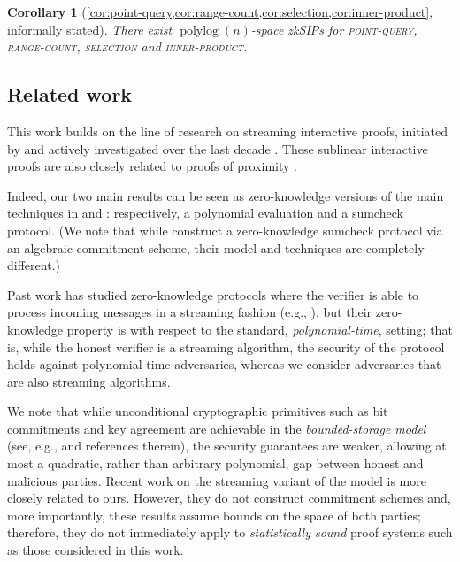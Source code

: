 \documentclass[a4paper,UKenglish,cleveref, autoref, thm-restate]{lipics-v2021}
\newtheorem{corollary}[theorem]{Corollary}
\theoremstyle{definition}
\newcommand{\zksip}{\textrm{zkSIP}}
\newcommand{\polylog}{\operatorname{polylog}}
\newcommand{\pointquery}{\normalfont\textsc{point-query}\xspace}
\newcommand{\rangecount}{\normalfont\textsc{range-count}\xspace}
\newcommand{\selection}{\normalfont\textsc{selection}\xspace}
\newcommand{\innerproductproblem}{\normalfont\textsc{inner-product}\xspace}
\begin{document}
\begin{corollary}[\cref{cor:point-query,cor:range-count,cor:selection,cor:inner-product}, informally stated]
    \label{infcor:inner-product}
    There exist $\polylog(n)$-space \zksip{}s for \pointquery, \rangecount, \selection and \innerproductproblem.
\end{corollary}

\subsection{Related work}

    This work builds on the line of research on streaming interactive proofs, initiated by \cite{CCM09,CCMT14} and actively investigated over the last decade \cite{CMT13, CTY11, CMT12, CCGT14, T14, GR15, CCMTV15, DTV15, ADRV16, CH18, CCMTV19, G20, CGT20}. These sublinear interactive proofs are also closely related to proofs of proximity \cite{RVW13, G17, GR17, GR18, GGR18, RR20,CG18a, GG21, GLR21, DGRT22}.
    
    Indeed, our two main results can be seen as zero-knowledge versions of the main techniques in \cite{CCMTV19} and \cite{CMT12}: respectively, a polynomial evaluation and a sumcheck protocol. (We note that while \cite{CFGS22} construct a zero-knowledge sumcheck protocol via an algebraic commitment scheme, their model and techniques are completely different.)
    
    Past work has studied zero-knowledge protocols where the verifier is able to process incoming messages in a streaming fashion (e.g., \cite{GKR08,CMT12}), but their zero-knowledge property is with respect to the standard, \emph{polynomial-time}, setting; that is, while the honest verifier is a streaming algorithm, the security of the protocol holds against polynomial-time adversaries, whereas we consider adversaries that are also streaming algorithms.

    We note that while unconditional cryptographic primitives such as bit commitments and key agreement are achievable in the \emph{bounded-storage model} (see, e.g., \cite{GZ19} and references therein), the security guarantees are weaker, allowing at most a quadratic, rather than arbitrary polynomial, gap between honest and malicious parties. Recent work on the streaming variant of the model \cite{DQW22,DQW23} is more closely related to ours. However, they do not construct commitment schemes and, more importantly, these results assume bounds on the space of both parties; therefore, they do not immediately apply to \emph{statistically sound} proof systems such as those considered in this work.
    
\end{document}
